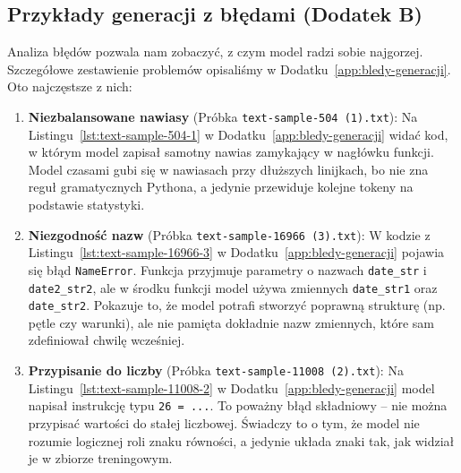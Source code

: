 \subsection{Przykłady generacji z błędami (Dodatek B)}

Analiza błędów pozwala nam zobaczyć, z czym model radzi sobie najgorzej. Szczegółowe zestawienie problemów opisaliśmy w Dodatku~\ref{app:bledy-generacji}. Oto najczęstsze z nich:

\begin{enumerate}
  \item \textbf{Niezbalansowane nawiasy} (Próbka \texttt{text-sample-504 (1).txt}):
  Na Listingu~\ref{lst:text-sample-504-1} w Dodatku~\ref{app:bledy-generacji} widać kod, w którym model zapisał samotny nawias zamykający w nagłówku funkcji. Model czasami gubi się w nawiasach przy dłuższych linijkach, bo nie zna reguł gramatycznych Pythona, a jedynie przewiduje kolejne tokeny na podstawie statystyki.
  
  \item \textbf{Niezgodność nazw} (Próbka \texttt{text-sample-16966 (3).txt}):
  W kodzie z Listingu~\ref{lst:text-sample-16966-3} w Dodatku~\ref{app:bledy-generacji} pojawia się błąd \texttt{NameError}. Funkcja przyjmuje parametry o nazwach \texttt{date\_str} i \texttt{date2\_str2}, ale w środku funkcji model używa zmiennych \texttt{date\_str1} oraz \texttt{date\_str2}. Pokazuje to, że model potrafi stworzyć poprawną strukturę (np. pętle czy warunki), ale nie pamięta dokładnie nazw zmiennych, które sam zdefiniował chwilę wcześniej.
  
  \item \textbf{Przypisanie do liczby} (Próbka \texttt{text-sample-11008 (2).txt}):
  Na Listingu~\ref{lst:text-sample-11008-2} w Dodatku~\ref{app:bledy-generacji} model napisał instrukcję typu \texttt{26 = ...}. To poważny błąd składniowy – nie można przypisać wartości do stałej liczbowej. Świadczy to o tym, że model nie rozumie logicznej roli znaku równości, a jedynie układa znaki tak, jak widział je w zbiorze treningowym.
\end{enumerate}